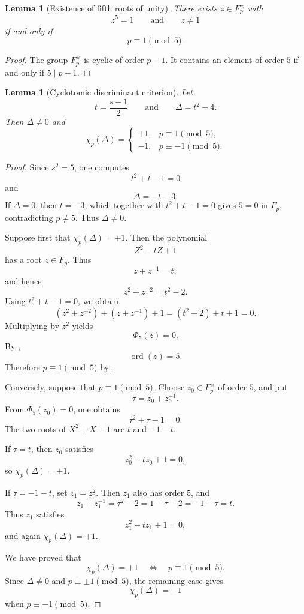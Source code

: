\documentclass[preprint,12pt]{elsarticle}
\def\F{F}%
\numberwithin{equation}{section}
\theoremstyle{plain}
\newtheorem{lemma}[theorem]{Lemma}
\theoremstyle{definition}
\DeclareMathOperator{\ord}{ord}
\newcommand{\F}{\mathbb{F}}
\begin{document}
\begin{lemma}[Existence of fifth roots of unity]
\label{lem:fifth-root-existence}
There exists $z\in\F_p^\times$ with
\[
z^5=1
\qquad\text{and}\qquad
z\ne1
\]
if and only if
\[
p\equiv1\pmod5.
\]
\end{lemma}
 
\begin{proof}
The group $\F_p^\times$ is cyclic of order $p-1$. It contains an
element of order $5$ if and only if $5\mid p-1$.
\end{proof}
 
\begin{lemma}[Cyclotomic discriminant criterion]
\label{lem:cyclotomic-discriminant}
Let
\[
t=\frac{s-1}{2}
\qquad\text{and}\qquad
\Delta=t^2-4.
\]
Then $\Delta\ne0$ and
\[
\chi_p(\Delta)=
\begin{cases}
+1,&p\equiv1\pmod5,\\
-1,&p\equiv-1\pmod5.
\end{cases}
\]
\end{lemma}
 
\begin{proof}
Since $s^2=5$, one computes
\[
t^2+t-1=0
\]
and
\[
\Delta=-t-3.
\]
If $\Delta=0$, then $t=-3$, which together with
$t^2+t-1=0$ gives $5=0$ in $\F_p$, contradicting $p\ne5$.
Thus $\Delta\ne0$.
 
Suppose first that $\chi_p(\Delta)=+1$. Then the polynomial
\[
Z^2-tZ+1
\]
has a root $z\in\F_p$. Thus
\[
z+z^{-1}=t,
\]
and hence
\[
z^2+z^{-2}=t^2-2.
\]
Using $t^2+t-1=0$, we obtain
\[
(z^2+z^{-2})+(z+z^{-1})+1
=
(t^2-2)+t+1
=
0.
\]
Multiplying by $z^2$ yields
\[
\Phi_5(z)=0.
\]
By ,
\[
\ord(z)=5.
\]
Therefore $p\equiv1\pmod5$ by .
 
Conversely, suppose that $p\equiv1\pmod5$. Choose
$z_0\in\F_p^\times$ of order $5$, and put
\[
\tau=z_0+z_0^{-1}.
\]
From $\Phi_5(z_0)=0$, one obtains
\[
\tau^2+\tau-1=0.
\]
The two roots of $X^2+X-1$ are $t$ and $-1-t$.
 
If $\tau=t$, then $z_0$ satisfies
\[
z_0^2-tz_0+1=0,
\]
so $\chi_p(\Delta)=+1$.
 
If $\tau=-1-t$, set $z_1=z_0^2$. Then $z_1$ also has order $5$, and
\[
z_1+z_1^{-1}
=
\tau^2-2
=
1-\tau-2
=
-1-\tau
=
t.
\]
Thus $z_1$ satisfies
\[
z_1^2-tz_1+1=0,
\]
and again $\chi_p(\Delta)=+1$.
 
We have proved that
\[
\chi_p(\Delta)=+1
\quad\Longleftrightarrow\quad
p\equiv1\pmod5.
\]
Since $\Delta\ne0$ and
$p\equiv\pm1\pmod5$, the remaining case gives
\[
\chi_p(\Delta)=-1
\]
when $p\equiv-1\pmod5$.
\end{proof}
 
\end{document}
